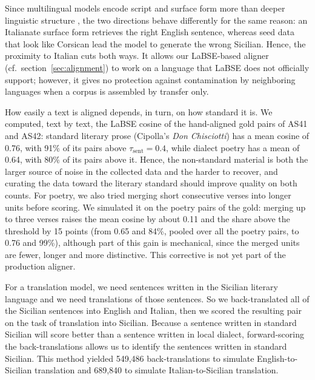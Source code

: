 \documentclass[11pt,a4paper]{article}
\begin{document}
Since multilingual models encode script and surface form more than deeper linguistic structure
\citep{verma2026script}, the two directions behave differently for the same reason: an
Italianate surface form retrieves the right English sentence,
whereas seed data that look like Corsican lead the model
to generate the wrong Sicilian.
Hence, the proximity to Italian cuts both
ways. It allows our LaBSE-based aligner (cf.\ section~\ref{sec:alignment}) to work on a language
that LaBSE does not officially support; however, it gives no protection against contamination by
neighboring languages when a corpus is assembled by transfer only.

How easily a text is aligned depends, in turn, on how standard it is. We computed, text by text,
the LaBSE cosine of the hand-aligned gold pairs of AS41 and AS42: standard literary prose
(Cipolla's \emph{Don Chisciotti}) has a mean cosine of 0.76, with 91\% of its pairs above
$\tau_{\text{sent}}=0.4$, while dialect poetry has a mean of 0.64, with 80\% of its pairs above it.
Hence, the non-standard material is both the larger source of noise in the collected data and
the harder to recover, and curating the data toward the literary standard should improve quality
on both counts. For poetry, we also tried merging short consecutive verses into
longer units before scoring. We simulated it on the poetry pairs of the gold: merging up to three
verses raises the mean cosine by about 0.11 and the share above the threshold by 15 points (from 0.65 and 84\%, pooled over all the poetry pairs, to 0.76 and
99\%), although part of this gain is mechanical, since the merged units are fewer, longer and
more distinctive. This corrective is not yet part of the production aligner.


For a translation model, we need sentences written in the Sicilian
literary language and we need translations of those sentences.
So we back-translated all of the Sicilian sentences into English and Italian,
then we scored the resulting pair on the task of translation into Sicilian.
Because a sentence written in standard Sicilian will score better
than a sentence written in local dialect, forward-scoring the back-translations
allows us to identify the sentences written in standard Sicilian.
This method yielded 549,486 back-translations to simulate English-to-Sicilian
translation and 689,840 to simulate Italian-to-Sicilian translation.
\end{document}

